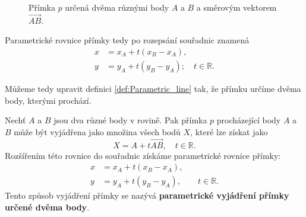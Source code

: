 \begin{figure}[H]
    \centering
    \caption{Přímka $p$ určená dvěma různými body $A$ a $B$ a směrovým vektorem $\overrightarrow{AB}$.}
    \label{fig:Parametric_line_two_points}
\end{figure}

Parametrické rovnice přímky tedy po rozepsání souřadnic znamená
\begin{align}
    x &= x_A+t(x_B-x_A),\\
    y &= y_A+t(y_B-y_A);\quad t\in\mathbb{R}.
\end{align}

Můžeme tedy upravit definici \ref{def:Parametric_line} tak, že přímku určíme dvěma body, kterými prochází.
\begin{definition}
    Nechť $A$ a $B$ jsou dva různé body v rovině. Pak přímka $p$ procházející body $A$ a $B$ může být vyjádřena jako množina všech bodů $X$, které lze získat jako
    \begin{equation}
        X = A + t\overrightarrow{AB}, \quad t \in \mathbb{R}.
    \end{equation}
    Rozšířením této rovnice do souřadnic získáme parametrické rovnice přímky:
    \begin{equation}
        \begin{aligned}
            x &= x_A + t(x_B - x_A), \\
            y &= y_A + t(y_B - y_A),
            \qquad t \in \mathbb{R}.
        \end{aligned}
        \label{eq:Parametric_line_two_points_coordinate_form}
    \end{equation}
    Tento způsob vyjádření přímky se nazývá \textbf{parametrické vyjádření přímky určené dvěma body}.
\end{definition}


